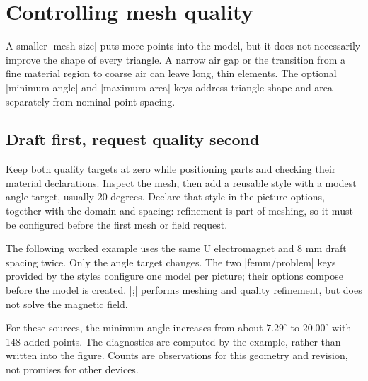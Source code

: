 \section{Controlling mesh quality}
\label{sec:mesh-quality}
A smaller |mesh size| puts more points into the model, but it does not
necessarily improve the shape of every triangle. A narrow air gap or the
transition from a fine material region to coarse air can leave long, thin
elements. The optional |minimum angle| and |maximum area| keys address
triangle shape and area separately from nominal point spacing.

\subsection{Draft first, request quality second}
Keep both quality targets at zero while positioning parts and checking their
material declarations. Inspect the mesh, then add a reusable style with a
modest angle target, usually 20 degrees. Declare that style in the picture
options, together with the domain and spacing: refinement is part of meshing,
so it must be configured before the first mesh or field request.

The following worked example uses the same U electromagnet and 8 mm draft
spacing twice. Only the angle target changes. The two |femm/problem| keys
provided by the styles configure one model per picture; their options compose
before the model is created. |;| performs meshing and quality
refinement, but does not solve the magnetic field.

For these sources, the minimum angle increases from about $7.29^\circ$ to
$20.00^\circ$ with 148 added points. The diagnostics are computed by the
example, rather than written into the figure. Counts are observations for
this geometry and revision, not promises for other devices.


\begin{codeexample}
\end{codeexample}

